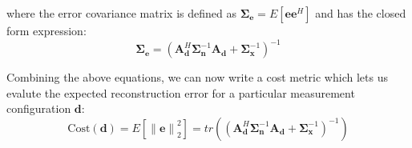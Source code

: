 \documentclass{article}
\providecommand{\norm}[1]{\left\lVert#1\right\rVert}
\begin{document}
where the error covariance matrix is defined as $\bm{\Sigma}_{\bm{e}} =
E[\bm{e}\bm{e}^H]$ and has the closed form expression:
\begin{equation}
\bm{\Sigma}_{\bm{e}} = \left( \bm{A}_{\bm{d}}^H\bm{\Sigma}_{\bm{n}}^{-1} \bm{A}_{\bm{d}} +
    \bm{\Sigma}_{\bm{x}}^{-1}\right)^{-1}
\end{equation}

Combining the above equations, we can now write a cost metric which lets us evalute
the expected reconstruction error for a particular measurement configuration $\bm{d}$:
\begin{equation}
\text{Cost}(\bm{d}) = E[\norm{\bm{e}}_2^2] = tr\left(\left( \bm{A}_{\bm{d}}^H\bm{\Sigma}_{\bm{n}}^{-1} \bm{A}_{\bm{d}} +
    \bm{\Sigma}_{\bm{x}}^{-1}\right)^{-1}\right)
\end{equation}



\end{document}
